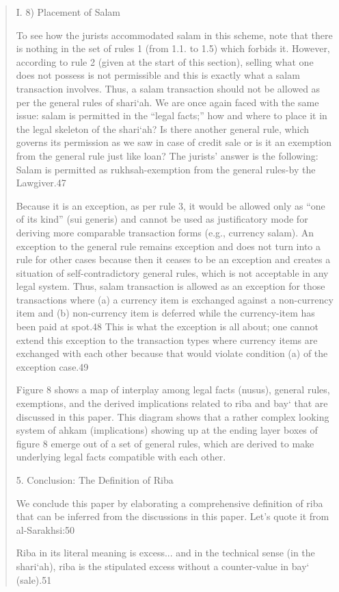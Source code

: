 \begin{quote}
I. 8) Placement of Salam

To see how the jurists accommodated salam in this scheme, note that there is nothing in the set of rules 1 (from 1.1. to 1.5) which forbids it. However, according to rule 2 (given at the start of this section), selling what one does not possess is not permissible and this is exactly what a salam transaction involves. Thus, a salam transaction should not be allowed as per the general rules of shari‘ah. We are once again faced with the same issue: salam is permitted in the “legal facts;” how and where to place it in the legal skeleton of the shari‘ah? Is there another general rule, which governs its permission as we saw in case of credit sale or is it an exemption from the general rule just like loan? The jurists' answer is the following: Salam is permitted as rukhsah-exemption from the general rules-by the Lawgiver.47

Because it is an exception, as per rule 3, it would be allowed only as “one of its kind” (sui generis) and cannot be used as justificatory mode for deriving more comparable transaction forms (e.g., currency salam). An exception to the general rule remains exception and does not turn into a rule for other cases because then it ceases to be an exception and creates a situation of self-contradictory general rules, which is not acceptable in any legal system. Thus, salam transaction is allowed as an exception for those transactions where (a) a currency item is exchanged against a non-currency item and (b) non-currency item is deferred while the currency-item has been paid at spot.48 This is what the exception is all about; one cannot extend this exception to the transaction types where currency items are exchanged with each other because that would violate condition (a) of the exception case.49

Figure 8 shows a map of interplay among legal facts (nusus), general rules, exemptions, and the derived implications related to riba and bay‘ that are discussed in this paper. This diagram shows that a rather complex looking system of ahkam (implications) showing up at the ending layer boxes of figure 8 emerge out of a set of general rules, which are derived to make underlying legal facts compatible with each other.

5. Conclusion: The Definition of Riba

We conclude this paper by elaborating a comprehensive definition of riba that can be inferred from the discussions in this paper. Let's quote it from al-Sarakhsi:50
\begin{Synthesis}
Riba in its literal meaning is excess... and in the technical sense (in the shari‘ah), riba is the stipulated excess without a counter-value in bay‘ (sale).51
\end{Synthesis}



\end{quote}
